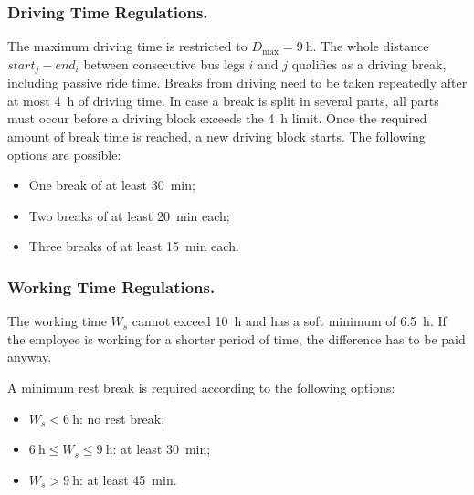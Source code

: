 \documentclass[]{amsart}
\theoremstyle{plain}
\begin{document}
\subsubsection{Driving Time Regulations.}
The maximum driving time is restricted to $D_\text{max}=\qty{9}{\hour}$. The whole distance $\mathit{start}_j-\mathit{end}_i$ between consecutive bus legs $i$ and $j$ qualifies as a driving break, including passive ride time. Breaks from driving need to be taken repeatedly after at most \qty{4}{\hour} of driving time. In case a break is split in several parts, all parts must occur before a driving block exceeds the \qty{4}{\hour} limit. Once the required amount of break time is reached, a new driving block starts. The following options are possible:
\begin{itemize}
	\item One break of at least \qty{30}{\minute};
	\item Two breaks of at least \qty{20}{\minute} each;
	\item Three breaks of at least \qty{15}{\minute} each.
\end{itemize}

\subsubsection{Working Time Regulations.}

The working time $W_s$ cannot exceed \qty{10}{\hour} and has a soft minimum of \qty{6.5}{\hour}. If the employee is working for a shorter period of time, the difference has to be paid anyway. 

A minimum rest break is required according to the following options:
\begin{itemize}
	\item $W_s<\qty{6}{\hour}$: no rest break;
	\item $\qty{6}{\hour}\leq W_s\leq\qty{9}{\hour}$: at least \qty{30}{\minute};
	\item $W_s>\qty{9}{\hour}$: at least \qty{45}{\minute}.
\end{itemize}
\end{document}
